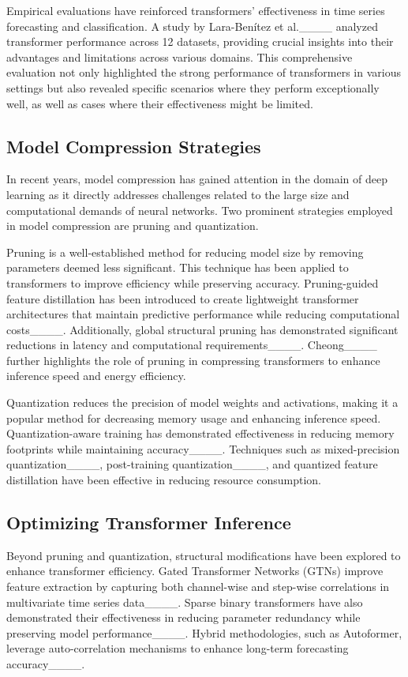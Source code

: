 Empirical evaluations have reinforced transformers' effectiveness in time series forecasting and classification. A study by Lara-Benítez et al.____ analyzed transformer performance across 12 datasets, providing crucial insights into their advantages and limitations across various domains. This comprehensive evaluation not only highlighted the strong performance of transformers in various settings but also revealed specific scenarios where they perform exceptionally well, as well as cases where their effectiveness might be limited.

\subsection{Model Compression Strategies}

In recent years, model compression has gained attention in the domain of deep learning as it directly addresses challenges related to the large size and computational demands of neural networks. Two prominent strategies employed in model compression are pruning and quantization. 

Pruning is a well-established method for reducing model size by removing parameters deemed less significant. This technique has been applied to transformers to improve efficiency while preserving accuracy. Pruning-guided feature distillation has been introduced to create lightweight transformer architectures that maintain predictive performance while reducing computational costs____. Additionally, global structural pruning has demonstrated significant reductions in latency and computational requirements____. Cheong____ further highlights the role of pruning in compressing transformers to enhance inference speed and energy efficiency.

Quantization reduces the precision of model weights and activations, making it a popular method for decreasing memory usage and enhancing inference speed. Quantization-aware training has demonstrated effectiveness in reducing memory footprints while maintaining accuracy____. Techniques such as mixed-precision quantization____, post-training quantization____, and quantized feature distillation have been effective in reducing resource consumption.


\subsection{Optimizing Transformer Inference}

Beyond pruning and quantization, structural modifications have been explored to enhance transformer efficiency. Gated Transformer Networks (GTNs) improve feature extraction by capturing both channel-wise and step-wise correlations in multivariate time series data____. Sparse binary transformers have also demonstrated their effectiveness in reducing parameter redundancy while preserving model performance____. Hybrid methodologies, such as Autoformer, leverage auto-correlation mechanisms to enhance long-term forecasting accuracy____.

